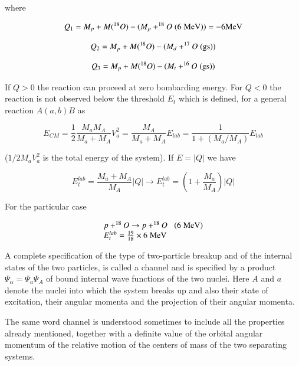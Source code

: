 \documentclass[a4paper,14pt]{book}
\begin{document}
\noindent where

\begin{equation}
Q_1 = M_p + M(^{18}O) - (M_p + ^{18}O \; (6 \;{\rm MeV})) = -6 {\rm MeV}
\end{equation}

\begin{equation}
Q_2 = M_p + M(^{18}O) - (M_d + ^{17}O \; ({\rm gs}))
\end{equation}

\begin{equation}
Q_3 = M_p + M(^{18}O) - (M_t + ^{16}O \; ({\rm gs}))
\end{equation}

\noindent If $Q>0$ the reaction can proceed at zero bombarding energy. For $Q<0$ the reaction is not observed below the threshold $E_t$ which is defined, for a general reaction $A(a,b)B$ as

\begin{equation}
E_{CM} = \frac{1}{2} \frac{M_a M_A}{M_a + M_A} V_a^2 = \frac{M_A}{M_a + M_A} E_{lab} = \frac{1}{1+(M_a/M_A)} E_{lab}
\end{equation}

\noindent ($1/2 M_a V_a^2$ is the total energy of the system). If $E=|Q|$ we have

\begin{equation}
E_t^{lab} = \frac{M_a + M_A}{M_A} |Q| \rightarrow E_t^{lab} = \left( 1+ \frac{M_a}{M_A} \right)  |Q|
\end{equation}

\noindent For the particular case

\begin{equation}
\begin{array}{l}
p + ^{18}O \rightarrow p + ^{18}O \;\;\; (6 \;{\rm MeV}) \\
E_t^{lab} = \frac{19}{18} \times 6 \;{\rm MeV}
\end{array}
\end{equation}

A complete specification of the type of two-particle breakup and of the internal states of the two particles, is called a channel and is specified by a product $\Psi_{\alpha} = \Psi_a \Psi_A$ of bound internal wave functions of the two nuclei. Here $A$ and $a$ denote the nuclei into which the system breaks up and also their state of excitation, their angular momenta and the projection of their angular momenta.

The same word channel is understood sometimes to include all the properties already mentioned, together with a definite value of the orbital angular momentum of the relative motion of the centers of mass of the two separating systems.
\end{document}
